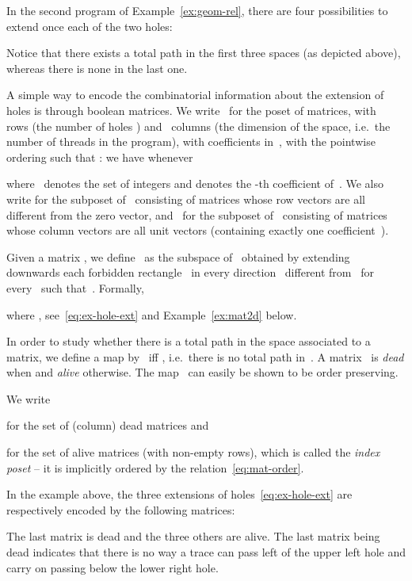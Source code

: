 \documentclass[orivec]{llncs} \usepackage[T1]{fontenc}
\newcommand{\nbd}{\nobreakdash-\hspace{0pt}}
\newcommand{\ie}{i.e.~}
\begin{document}
In the second program of Example~\ref{ex:geom-rel}, there are four possibilities
to extend once each of the two holes:

Notice that there exists a total path in the first three spaces (as depicted
above), whereas there is none in the last one.

A simple way to encode the combinatorial information about the extension of
holes is through boolean matrices. We write~ for the poset of
 matrices, with~ rows (the number of holes ) and~ columns
(the dimension of the space, \ie the number of threads in the program), with
coefficients in~, with the pointwise ordering such that : we
have  whenever

where~ denotes the set  of integers and 
denotes the \nbd{}th coefficient of~. We also write  for
the subposet of~ consisting of matrices whose row vectors are all
different from the zero vector, and~ for the subposet
of~ consisting of matrices whose column vectors are all unit vectors
(containing exactly one coefficient~).

Given a matrix , we define~ as the subspace of~ obtained
by extending downwards each forbidden rectangle~ in every direction~
different from~ for every~ such that~. Formally,

where , see~\eqref{eq:ex-hole-ext} and
Example~\ref{ex:mat2d} below.


In order to study whether there is a total path in the space associated to a
matrix, we define a map \hbox{} by~ iff
, \ie there is no total path in~. A matrix~ is
\emph{dead} when  and \emph{alive} otherwise. The map~ can
easily be shown to be order preserving.

\begin{definition}
  We write
  
  for the set of (column) dead matrices and
  
  for the set of alive matrices (with non-empty rows), which is called the
  \emph{index poset} -- it is implicitly ordered by the
  relation~\eqref{eq:mat-order}.
\end{definition}

\begin{example}
  \label{ex:mat2d}
  In the example above, the three extensions of holes~\eqref{eq:ex-hole-ext} are
  respectively encoded by the following matrices:
  
  The last matrix is dead and the three others are alive. The last matrix being
  dead indicates that there is no way a trace can pass left of the upper left
  hole and carry on passing below the lower right hole.
\end{example}
\end{document}
